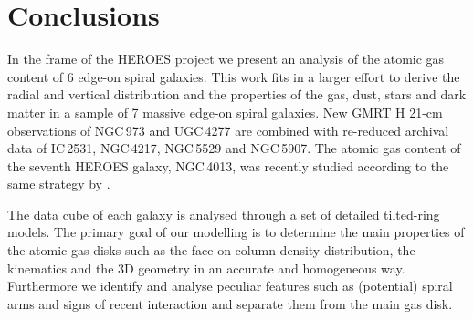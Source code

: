 \documentclass{aa}
\begin{document}
\section{Conclusions}
\label{sec:conclusions}

In the frame of the HEROES project we present an analysis of the atomic gas content of 6 edge-on spiral galaxies. This work fits in a larger effort to derive the radial and vertical distribution and the properties of the gas, dust, stars and dark matter in a sample of 7 massive edge-on spiral galaxies. New GMRT H{} 21-cm observations of NGC\,973 and UGC\,4277 are combined with re-reduced archival data of IC\,2531, NGC\,4217, NGC\,5529 and NGC\,5907. The atomic gas content of the seventh HEROES galaxy, NGC\,4013, was recently studied according to the same strategy by \cite{zschaechner15}.
\par
The data cube of each galaxy is analysed through a set of detailed tilted-ring models. The primary goal of our modelling is to determine the main properties of the atomic gas disks such as the face-on column density distribution, the kinematics and the 3D geometry in an accurate and homogeneous way. Furthermore we identify and analyse peculiar features such as (potential) spiral arms and signs of recent interaction and separate them from the main gas disk. 
\end{document}
